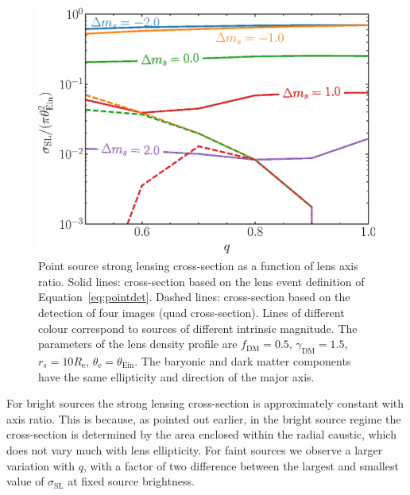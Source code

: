 \documentclass{aa}
\def\reff{R_{\mathrm{e}}}
\def\mstar{M_*}
\def\gammadm{\gamma_{\mathrm{DM}}}
\def\fdm{f_{\mathrm{DM}}}
\def\tein{\theta_{\mathrm{Ein}}}
\def\teff{\theta_{\mathrm{e}}}
\def\crosssect{\sigma_\mathrm{{SL}}}
\def\Eref#1{Equation~\ref{#1}\xspace}
\begin{document}
\begin{figure}
\includegraphics[width=\columnwidth]{ell_pnt_cs.eps}
\caption{
Point source strong lensing cross-section as a function of lens axis ratio.
Solid lines: cross-section based on the lens event definition of \Eref{eq:pointdet}.
Dashed lines: cross-section based on the detection of four images (quad cross-section).
Lines of different colour correspond to sources of different intrinsic magnitude.
The parameters of the lens density profile are $\fdm=0.5$, $\gammadm=1.5$, $r_s=10\reff$, $\teff=\tein$.
The baryonic and dark matter components have the same ellipticity and direction of the major axis.
\label{fig:ellpoint_cs}
}
\end{figure}

For bright sources the strong lensing cross-section is approximately constant with axis ratio. This is because, as pointed out earlier, in the bright source regime the cross-section is determined by the area enclosed within the radial caustic, which does not vary much with lens ellipticity.
For faint sources we observe a larger variation with $q$, with a factor of two difference between the largest and smallest value of $\crosssect$ at fixed source brightness.
\end{document}
